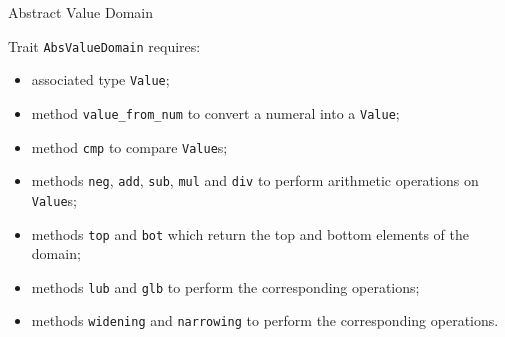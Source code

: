 \documentclass{beamer}
\begin{document}
\begin{frame}{Abstract Value Domain}

    Trait \texttt{AbsValueDomain} requires:
    \begin{itemize}
        \item associated type \texttt{Value};
        \item method \texttt{value\_from\_num} to convert a numeral into a \texttt{Value};
        \item method \texttt{cmp} to compare \texttt{Value}s;
        \item methods \texttt{neg}, \texttt{add}, \texttt{sub}, \texttt{mul} and \texttt{div} to perform arithmetic operations on \texttt{Value}s;
        \item methods \texttt{top} and \texttt{bot} which return the top and bottom elements of the domain;
        \item methods \texttt{lub} and \texttt{glb} to perform the corresponding operations;
        \item methods \texttt{widening} and \texttt{narrowing} to perform the corresponding operations.
    \end{itemize}

\end{frame}
\end{document}
